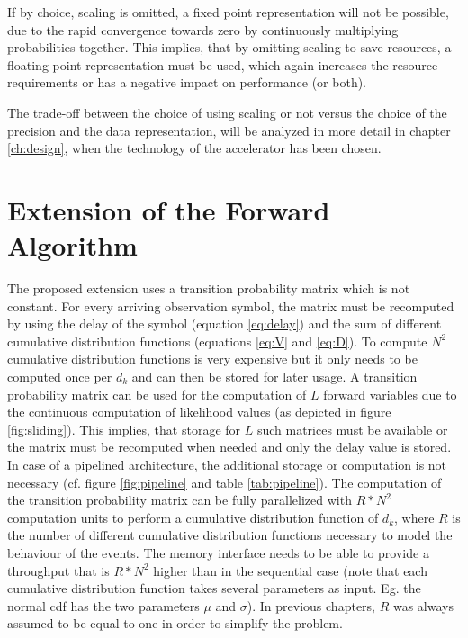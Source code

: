 \documentclass[mscthesis]{usiinfthesis}
\begin{document}
If by choice, scaling is omitted, a fixed point representation will not be
possible, due to the rapid convergence towards zero by continuously multiplying
probabilities together. This implies, that by omitting scaling to save
resources, a floating point representation must be used, which again increases
the resource requirements or has a negative impact on performance (or both).

The trade-off between the choice of using scaling or not versus the choice of
the precision and the data representation, will be analyzed in more detail in
chapter \ref{ch:design}, when the technology of the accelerator has been
chosen.

\section{Extension of the Forward Algorithm}
\label{ch:analysis_extension}

The proposed extension uses a transition probability matrix which is not
constant. For every arriving observation symbol, the matrix must be recomputed
by using the delay of the symbol (equation \ref{eq:delay}) and the sum of
different cumulative distribution functions (equations \ref{eq:V} and
\ref{eq:D}). To compute $N^2$ cumulative distribution functions is very
expensive but it only needs to be computed once per $d_k$ and can then be
stored for later usage. A transition probability matrix can be used for the
computation of $L$ forward variables due to the continuous computation of
likelihood values (as depicted in figure \ref{fig:sliding}). This implies, that
storage for $L$ such matrices must be available or the matrix must be
recomputed when needed and only the delay value is stored. In case of
a pipelined architecture, the additional storage or computation is not
necessary (cf. figure \ref{fig:pipeline} and table \ref{tab:pipeline}). The
computation of the transition probability matrix can be fully parallelized with
$R*N^2$ computation units to perform a cumulative distribution function of
$d_k$, where $R$ is the number of different cumulative distribution functions
necessary to model the behaviour of the events. The memory interface needs to
be able to provide a throughput that is $R*N^2$ higher than in the sequential
case (note that each cumulative distribution function takes several parameters
as input. Eg. the normal \gls{cdf} has the two parameters $\mu$ and $\sigma$). In
previous chapters, $R$ was always assumed to be equal to one in order to
simplify the problem.
\end{document}
